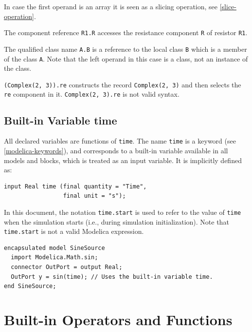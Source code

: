 In case the first operand is an array it is seen as a slicing operation, see \cref{slice-operation}.

\begin{example}
The component reference \lstinline!R1.R! accesses the resistance component \lstinline!R! of resistor \lstinline!R1!.

The qualified class name \lstinline!A.B! is a reference to the local class \lstinline!B! which is a member of the class \lstinline!A!.
Note that the left operand in this case is a class, not an instance of the class.

\lstinline!(Complex(2, 3)).re! constructs the record \lstinline!Complex(2, 3)! and then selects the \lstinline!re! component in it.
\lstinline!Complex(2, 3).re! is not valid syntax.
\end{example}

\subsection{Built-in Variable time}\label{built-in-variable-time}

All declared variables are functions of \lstinline!time!.
The name \lstinline!time! is a keyword (see \cref{modelica-keywords}), and corresponds to a built-in variable available in all models and blocks, which is treated as an input variable.
It is implicitly defined as:
\begin{lstlisting}[language=modelica]
input Real time (final quantity = "Time",
                 final unit = "s");
\end{lstlisting}

In this document, the notation \lstinline!time.start! is used to refer to the value of \lstinline!time! when the simulation starts (i.e., during simulation initialization).
Note that \lstinline!time.start! is not a valid Modelica expression.

\begin{example}
\begin{lstlisting}[language=modelica]
encapsulated model SineSource
  import Modelica.Math.sin;
  connector OutPort = output Real;
  OutPort y = sin(time); // Uses the built-in variable time.
end SineSource;
\end{lstlisting}
\end{example}

\section{Built-in Operators and Functions}\label{built-in-intrinsic-operators-with-function-syntax}

